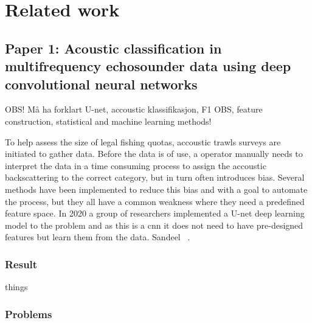 \chapter{Related work}



\section{Paper 1: Acoustic classification in multifrequency echosounder data using deep convolutional neural networks}
    
    
    OBS! Må ha forklart U-net, accoustic klassifikasjon, F1 OBS, feature construction, statistical and machine learning methods!
    
    To help assess the size of legal fishing quotas, accoustic trawls surveys are initiated to gather data. Before the data is of use, a operator manually needs to interpret the data in a time consuming process to assign the accoustic backscattering to the correct category, but in turn often introduces bias. Several methods have been implemented to reduce this bias and with a goal to automate the process, but they all have a common weakness where they need a predefined feature space.  In 2020 a group of researchers implemented a U-net deep learning model to the problem and as this is a \gls{cnn} it does not need to have pre-designed features but learn them from the data. Sandeel  ~\cite{brautaset2020acoustic}. 
    
    
    
    \subsection{Result}
        things
    \subsection{Problems}